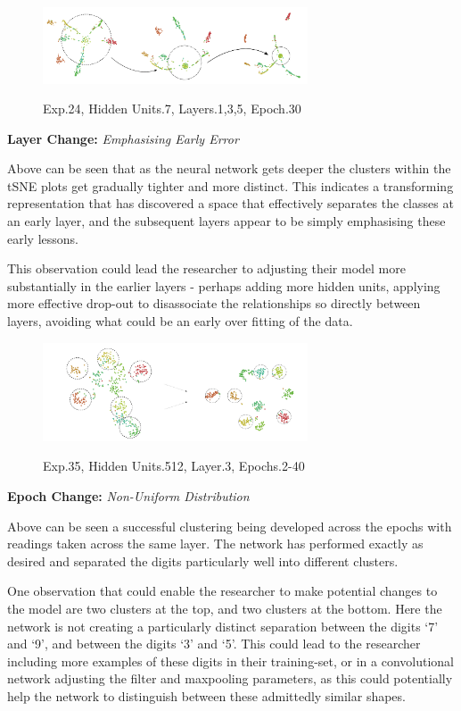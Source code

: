 \documentclass[a4paper,11pt,titlepage]{article}
\begin{document}
	\begin{figure}[H]
    			\centering	
			{{\includegraphics[width=0.7\textwidth]
    				{img/conc_X24_H7_L1-3-5_E30.png} 
    			}}%
    			\caption{Exp.24, Hidden Units.7, Layers.1,3,5, Epoch.30}%
    		\label{fig:mnistHinton}
	\end{figure}
	
	\textbf{Layer Change:} \textit{Emphasising Early Error}
	\par
	Above can be seen that as the neural network gets deeper the clusters within the tSNE plots get gradually tighter and more distinct. This indicates a transforming representation that has discovered a space that effectively separates the classes at an early layer, and the subsequent layers appear to be simply emphasising these early lessons.
	\par 
	This observation could lead the researcher to adjusting their model more substantially in the earlier layers - perhaps adding more hidden units, applying more effective drop-out to disassociate the relationships so directly between layers, avoiding what could be an early over fitting of the data.

	\begin{figure}[H]
    			\centering	
			{{\includegraphics[width=0.7\textwidth]
    				{img/conc_X35_H512_L3_E2-40.png} 
    			}}%
    			\caption{Exp.35, Hidden Units.512, Layer.3, Epochs.2-40}%
    		\label{fig:mnistHinton}
	\end{figure}
	
	\textbf{Epoch Change:} \textit{Non-Uniform Distribution}
	\par 
	Above can be seen a successful clustering being developed across the epochs with readings taken across the same layer. The network has performed exactly as desired and separated the digits particularly well into different clusters.
	\par 
	One observation that could enable the researcher to make potential changes to the model are two clusters at the top, and two clusters at the bottom. Here the network is not creating a particularly distinct separation between the digits `7' and `9', and between the digits `3' and `5'. This could lead to the researcher including more examples of these digits in their training-set, or in a convolutional network adjusting the filter and maxpooling parameters, as this could potentially help the network to distinguish between these admittedly similar shapes.
\end{document}
